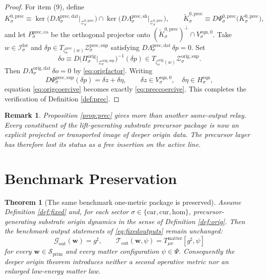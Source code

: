 \documentclass[11pt]{article}
\newcommand{\CompletedMetric}{g^{\sharp}}
\newcommand{\Car}{\mathrm{car}}
\newcommand{\Cur}{\mathrm{cur}}
\newcommand{\Hom}{\mathrm{hom}}
\newcommand{\ForSpace}[1]{\mathcal I_{#1}^{\mathrm{for}}}
\newcommand{\PrimShell}{\mathcal S_{\mathrm{prim}}}
\newcommand{\MetricOut}{\mathscr G_{\mathrm{out}}}
\newcommand{\MatterOut}{\mathscr T_{\mathrm{out}}}
\newcommand{\EqnHidden}[1]{H_{#1}^{\mathrm{eqn}}}
\newcommand{\EqnZero}[1]{V_{#1}^{\mathrm{eqn},0}}
\newcommand{\PrecData}[1]{\Lambda_{#1}^{\mathrm{prec,dat}}}
\newcommand{\PrecShellMap}[1]{\Lambda_{#1}^{\mathrm{prec,sh}}}
\newcommand{\PrecSupportShell}[1]{\mathcal Z_{#1}^{\mathrm{prec,sup}}}
\newcommand{\PrecZeroCore}[1]{\mathcal Z_{#1}^{0,\mathrm{prec}}}
\newcommand{\PrecEqChart}[1]{\Psi_{#1}^{\mathrm{prec,sup}}}
\newcommand{\PrecZeroChart}[1]{\Psi_{#1}^{0,\mathrm{prec}}}
\newcommand{\PrecEmbed}[1]{\zeta_{#1}^{\mathrm{prec}}}
\newcommand{\PrecKernel}[1]{K_{#1}^{0,\mathrm{prec}}}
\newcommand{\PrecKernelCh}[1]{\widetilde K_{#1}^{0,\mathrm{prec}}}
\newcommand{\PrecStateComp}[1]{P_{#1}^{\mathrm{prec,co}}}
\newcommand{\OrigProj}[1]{\Pi_{#1}^{\mathrm{orig}}}
\newcommand{\OrigData}[1]{\Lambda_{#1}^{\mathrm{orig,dat}}}
\newcommand{\OrigSupportShell}[1]{\mathcal Z_{#1}^{\mathrm{orig,sup}}}
\newcommand{\OrigEmbed}[1]{\zeta_{#1}^{\mathrm{orig}}}
\newtheorem{remark}{Remark}
\newtheorem{theorem}{Theorem}
\begin{document}
\begin{proof}
For item (9), define
\[
\PrecKernel{\sigma}
\equiv
\ker\bigl(D\PrecData{\sigma}\big|_{\PrecZeroCore{\sigma}}\bigr)
\cap
\ker\bigl(D\PrecShellMap{\sigma}\big|_{\PrecZeroCore{\sigma}}\bigr),
\qquad
\PrecKernelCh{\sigma}
\equiv
D\PrecZeroChart{\sigma}\bigl(\PrecKernel{\sigma}\bigr),
\]
and let \(\PrecStateComp{\sigma}\) be the orthogonal projector onto \((\PrecKernelCh{\sigma})^{\perp}\cap\EqnZero{\sigma}\). Take \(w\in\ForSpace{\sigma}\) and \(\delta p\in T_{\PrecEmbed{\sigma}(w)}\PrecSupportShell{\sigma}\) satisfying \(D\PrecData{\sigma}\,\delta p=0\). Set
\[
\delta o
\equiv
D\bigl(\OrigProj{\sigma}\big|_{\OrigSupportShell{\sigma}}\bigr)^{-1}(\delta p)
\in
T_{\OrigEmbed{\sigma}(w)}\OrigSupportShell{\sigma}.
\]
Then \(D\OrigData{\sigma}\,\delta o=0\) by \eqref{eq:origfactor}. Writing
\[
D\PrecEqChart{\sigma}(\delta p)=\delta z+\delta\eta,
\qquad
\delta z\in\EqnZero{\sigma},
\quad
\delta\eta\in\EqnHidden{\sigma},
\]
equation \eqref{eq:origcoercive} becomes exactly \eqref{eq:preccoercive}. This completes the verification of Definition \ref{def:prec}.
\end{proof}

\begin{remark}
Proposition \ref{prop:prec} gives more than another same-output relay. Every constituent of the lift-generating substrate precursor package is now an explicit projected or transported image of deeper origin data. The precursor layer has therefore lost its status as a free insertion on the active line.
\end{remark}

\section{Benchmark Preservation}

\begin{theorem}[The same benchmark one-metric package is preserved]
\label{thm:outputs}
Assume Definition \ref{def:fixed} and, for each sector \(\sigma\in\{\Car,\Cur,\Hom\}\), precursor-generating substrate origin dynamics in the sense of Definition \ref{def:orig}. Then the benchmark output statements of \eqref{eq:fixedoutputs} remain unchanged:
\[
\MetricOut(\mathbf w)=\CompletedMetric,
\qquad
\MatterOut(\mathbf w,\psi)
=
T_{\mu\nu}^{\mathrm{matter}}[\CompletedMetric,\psi]
\]
for every \(\mathbf w\in\PrimShell\) and every matter configuration \(\psi\in\Psi\). Consequently the deeper origin theorem introduces neither a second operative metric nor an enlarged low-energy matter law.
\end{theorem}
\end{document}
